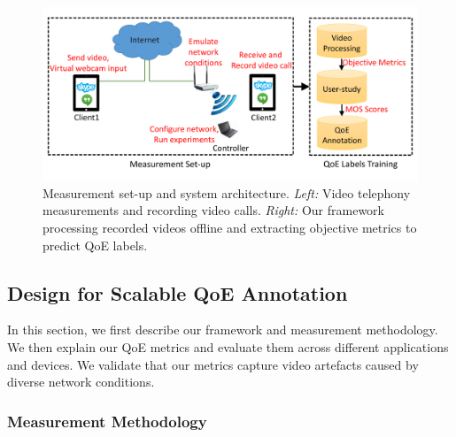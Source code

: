 \begin{figure}[t]
  \centering
  \includegraphics[width=\linewidth]{sections/network-work/setup}
    \caption{Measurement set-up and system architecture. \textit{Left:} Video telephony measurements and recording video calls. \textit{Right:} Our framework processing recorded videos offline and extracting objective metrics to predict QoE labels.}
  \label{fig:set-up}
\end{figure}
\subsection{Design for Scalable QoE Annotation} \label{label:design}
In this section, we first describe our framework and measurement methodology. 
We then explain our QoE metrics and evaluate them across different applications and devices. We validate that our metrics capture video artefacts caused by diverse network conditions.
\subsubsection{Measurement Methodology}

